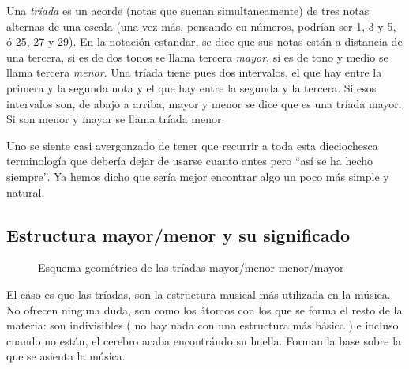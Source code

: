\documentclass[]{article}
\begin{document}
Una \emph{tríada} es un acorde (notas que suenan simultaneamente) de tres notas alternas de una escala (una vez más, pensando en números, podrían ser 1, 3 y 5, ó 25, 27 y 29). En la notación estandar, se dice que sus notas están a distancia de una tercera, si es de dos tonos se llama tercera \emph{mayor}, si es de tono y medio se llama tercera \emph{menor}. Una tríada tiene pues dos intervalos, el que hay entre la primera y la segunda nota y el que hay entre la segunda y la tercera. Si esos intervalos son, de abajo a arriba, mayor y menor se dice que es una tríada mayor. Si son menor y mayor se llama tríada menor.

Uno se siente casi avergonzado de tener que recurrir a toda esta dieciochesca terminología que debería dejar de usarse cuanto antes pero ``así se ha hecho siempre''. Ya hemos dicho que sería mejor encontrar algo un poco más simple y natural.

\subsection{Estructura mayor/menor y su significado}

\begin{figure}
  \center
 
   \vspace{12pt}
 
 \caption{Esquema geométrico de las tríadas mayor/menor menor/mayor}
 \label{fig:maj-minor-scheme}
 \end{figure}

 
El caso es que las tríadas, son la estructura musical más utilizada en la música. No ofrecen ninguna duda, son como los átomos con los que se forma el resto de la materia: son indivisibles ( no hay nada con una estructura más básica ) e incluso cuando no están, el cerebro acaba encontrándo su huella. Forman la base sobre la que se asienta la música.
\end{document}
